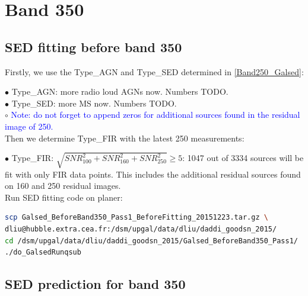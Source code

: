 \documentclass[11pt,a4paper]{article}
\begin{document}

\clearpage

\section{Band 350}

\subsection{SED fitting before band 350}
\label{Band350_Galsed}

Firstly, we use the Type\_AGN and Type\_SED determined in \ref{Band250_Galsed}:

\indent\hspace{15pt}$\bullet$ 
Type\_AGN: more radio loud AGNs now. Numbers TODO. 
\\
\indent\hspace{15pt}$\bullet$ 
Type\_SED: more MS now. Numbers TODO. 
\\
\indent\hspace{15pt}$\circ$ 
\textcolor{blue}{Note: \textcolor{blue}{do not forget} to append zeros for additional sources found in the residual image of 250.}
\\

Then we determine Type\_FIR with the latest 250 measurements:

\indent\hspace{15pt}$\bullet$ 
Type\_FIR: $\sqrt{SNR_{100}^2+SNR_{160}^2+SNR_{250}^2} \ge 5$: 1047 out of 3334 sources will be fit with only FIR data points. This includes the additional residual sources found on 160 and 250 residual images. 
\\

Run SED fitting code on planer:

\begin{lstlisting}[language=bash]
scp Galsed_BeforeBand350_Pass1_BeforeFitting_20151223.tar.gz \
dliu@hubble.extra.cea.fr:/dsm/upgal/data/dliu/daddi_goodsn_2015/
cd /dsm/upgal/data/dliu/daddi_goodsn_2015/Galsed_BeforeBand350_Pass1/
./do_GalsedRunqsub
\end{lstlisting}

\subsection{SED prediction for band 350}
\label{Band350_Galpre}
\end{document}

